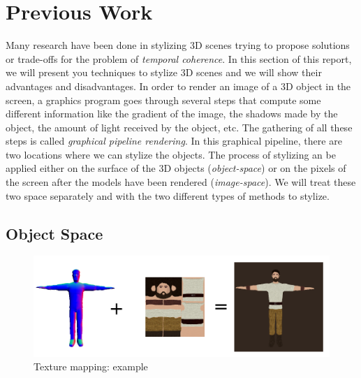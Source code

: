 \chapter{Previous Work}

Many research have been done in stylizing 3D scenes\cite{schmid_overcoat:_2011, praun_real-time_2001, klein_non-photorealistic_2000, benard_dynamic_2009, benard_dynamic_2010, freudenberg_walk-through_2001, benard_state---art_2011} trying to propose solutions or trade-offs for the problem of \textit{temporal coherence}. In this section of this report, we will present you techniques to stylize 3D scenes and we will show their advantages and disadvantages. In order to render an image of a 3D object in the screen, a graphics program goes through several steps that compute some different information like the gradient of the image, the shadows made by the object, the amount of light received by the object, etc. The gathering of all these steps is called \textit{graphical pipeline rendering}. In this graphical pipeline, there are two locations where we can stylize the objects. The process of stylizing an be applied either on the surface of the 3D objects (\textit{object-space}) or on the pixels of the screen after the models have been rendered (\textit{image-space}). We will treat these two space separately and with the two different types of methods to stylize.



\section{Object Space}


\begin{figure}
    \begin{center}
    \includegraphics[scale=0.4]{pics/texture_mapping.png}
    \end{center}
    \caption{Texture mapping: example}
    \label{texture_mapping}
\end{figure}

